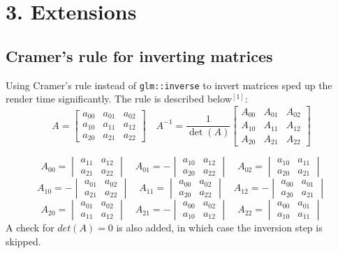 \documentclass[DIV=calc, paper=a4, fontsize=11pt, twocolumn]{article}	 %
\begin{document}
	\section*{3. Extensions}
	\subsection*{Cramer's rule for inverting matrices}
	Using Cramer's rule instead of \texttt{glm::inverse} to invert matrices sped up the render time significantly. The rule is described below$^{[1]}$:
	\[
		A = 
		\begin{bmatrix} 
		a_{00} & a_{01} & a_{02} \\
		a_{10} & a_{11} & a_{12} \\
		a_{20} & a_{21} & a_{22} 
		\end{bmatrix}
		\quad
		A^{-1} = \dfrac{1}{\operatorname{det}(A)}
		\begin{bmatrix} 
		A_{00} & A_{01} & A_{02} \\
		A_{10} & A_{11} & A_{12} \\
		A_{20} & A_{21} & A_{22} 
		\end{bmatrix}
	\]

	\[	
		A_{00} =
		\begin{vmatrix} 
		a_{11} & a_{12} \\
		a_{21} & a_{22} 
		\end{vmatrix}
		\quad
		A_{01} = -
		\begin{vmatrix} 
		a_{10} & a_{12} \\
		a_{20} & a_{22} 
		\end{vmatrix}
		\quad
		A_{02} =
		\begin{vmatrix} 
		a_{10} & a_{11} \\
		a_{20} & a_{21} 
		\end{vmatrix}
		\]\[
		A_{10} = -
		\begin{vmatrix} 
		a_{01} & a_{02} \\
		a_{21} & a_{22} 
		\end{vmatrix}
		\quad
		A_{11} =
		\begin{vmatrix} 
		a_{00} & a_{02} \\
		a_{20} & a_{22} 
		\end{vmatrix}
		\quad
		A_{12} = - 
		\begin{vmatrix} 
		a_{00} & a_{01} \\
		a_{20} & a_{21} 
		\end{vmatrix}
		\]\[
		A_{20} =
		\begin{vmatrix} 
		a_{01} & a_{02} \\
		a_{11} & a_{12} 
		\end{vmatrix}
		\quad
		A_{21} = -
		\begin{vmatrix} 
		a_{00} & a_{02} \\
		a_{10} & a_{12} 
		\end{vmatrix}
		\quad
		A_{22} =
		\begin{vmatrix} 
		a_{00} & a_{01} \\
		a_{10} & a_{11} 
		\end{vmatrix}
	\]
	A check for $det(A) = 0$ is also added, in which case the inversion step is skipped.
	
\end{document}
